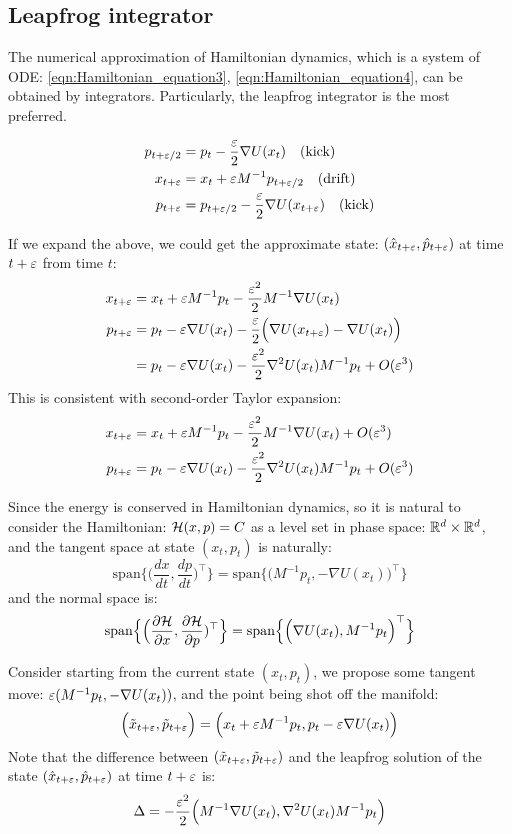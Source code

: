 \documentclass[hidelinks]{article}[12pt]
\begin{document}
\subsection{Leapfrog integrator}
The numerical approximation of Hamiltonian dynamics, which is a system of ODE: \ref{eqn:Hamiltonian_equation3}, \ref{eqn:Hamiltonian_equation4}, 
can be obtained by integrators. Particularly, the leapfrog integrator is the most preferred. 

\begin{align*}
p_{t+\varepsilon/2} &= p_t - \frac{\varepsilon}{2} \nabla U(x_t) \quad \text{(kick)}\\
x_{t+\varepsilon} &= x_t + \varepsilon M^{-1} p_{t+\varepsilon/2} \quad \text{(drift)}\\
p_{t+\varepsilon} &= p_{t+\varepsilon/2} - \frac{\varepsilon}{2} \nabla U(x_{t+\varepsilon}) \quad \text{(kick)}\\
\end{align*}

If we expand the above, we could get the approximate state: $(\hat x_{t+\varepsilon}, \hat p_{t+\varepsilon})$ at time $t+ \varepsilon$ from time $t$:
\begin{align*}
x_{t+\varepsilon} &= x_t + \varepsilon M^{-1} p_t - \frac{\varepsilon^2}{2} M^{-1}\nabla U(x_t)\\
p_{t+\varepsilon} &= p_t - \varepsilon \nabla U(x_t) - \frac{\varepsilon}{2}\Big(\nabla U(x_{t+\varepsilon}) - \nabla U(x_t)\Big)\\
&= p_t - \varepsilon \nabla U(x_t) - \frac{\varepsilon^2}{2} \nabla^2 U(x_t) M^{-1} p_t + O(\varepsilon^3)
\end{align*}
This is consistent with second-order Taylor expansion:
\begin{align*}
x_{t+\varepsilon} &= x_t + \varepsilon M^{-1} p_t - \frac{\varepsilon^2}{2} M^{-1} \nabla U(x_t) + O(\varepsilon^3)\\
p_{t+\varepsilon} &= p_t - \varepsilon \nabla U(x_t) - \frac{\varepsilon^2}{2} \nabla^2 U(x_t) M^{-1} p_t + O(\varepsilon^3)
\end{align*}

Since the energy is conserved in Hamiltonian dynamics, so it is natural to consider the Hamiltonian: ${\cal H}(x, p) = C$ as a level set in phase space: $\mathbb R^d \times \mathbb R^d$, and the tangent space at state $(x_t, p_t)$ is naturally:
\[\text{span}\Big\{\Big(\frac{dx}{dt}, \frac{dp}{dt}\Big)^\top\Big\} = \text{span}\Big\{\Big(M^{-1} p_t, - \nabla U(x_t)\Big)^\top\Big\}\]
and the normal space is:
\[\text{span}\Big\{\Big(\frac{\partial{{\cal H}}}{\partial{x}}, \frac{\partial{{\cal H}}}{\partial{p}})^\top\Big\} = \text{span}\Big\{\Big(\nabla U(x_t), M^{-1} p_t\Big)^\top\Big\}\]

Consider starting from the current state $(x_t, p_t)$, we propose some tangent move: $\varepsilon (M^{-1} p_t, - \nabla U(x_t))$, and the point being shot off the manifold:
\[\Big(\tilde x_{t+\varepsilon}, \tilde p_{t+\varepsilon}\Big) = \Big(x_t + \varepsilon M^{-1} p_t, p_t - \varepsilon \nabla U(x_t)\Big)\]
Note that the difference between $(\tilde x_{t+\varepsilon}, \tilde p_{t+\varepsilon})$ and the leapfrog solution of the state $(\hat x_{t+\varepsilon}, \hat p_{t+\varepsilon})$ at time $t + \varepsilon$ is:
\[\Delta = -\frac{\varepsilon^2}{2}\Big(M^{-1} \nabla U(x_t), \nabla^2 U(x_t) M^{-1} p_t\Big)\]
\end{document}
